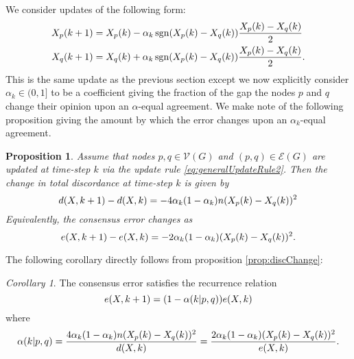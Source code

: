 \documentclass{article}
\newtheorem{proposition}{Proposition}
\theoremstyle{remark}
\newtheorem{corollary}{Corollary}
\DeclareMathOperator{\sgn}{sgn}
\begin{document}
We consider updates of the following form:
\begin{equation}{\label{eq:generalUpdateRule2}}
\begin{aligned}
        X_p(k+1) &= X_p(k) - \alpha_k\sgn(X_p(k)-X_q(k))\frac{X_p(k)-X_q(k)}{2}\\
        X_q(k+1) &= X_q(k) + \alpha_k\sgn(X_p(k)-X_q(k))\frac{X_p(k)-X_q(k)}{2}.
\end{aligned}
\end{equation}
This is the same update as the previous section except we now explicitly consider $\alpha_k\in(0,1]$ to be a coefficient giving the fraction of the gap the nodes $p$ and $q$ change their opinion upon an $\alpha$-equal agreement. We make note of the following proposition giving the amount by which the error changes upon an $\alpha_k$-equal agreement.
\begin{proposition}{\label{prop:discChange}}
        Assume that nodes $p,q\in\mathcal{V}(G)$ and $(p,q)\in\mathcal{E}(G)$ are updated at time-step $k$ via the update rule \eqref{eq:generalUpdateRule2}. Then the change in total discordance at time-step $k$ is given by
\begin{equation}{\label{prop:eq:discIncrement}}
        d(X,k+1)-d(X,k) = -4\alpha_k(1-\alpha_k)n(X_p(k)-X_q(k))^2
\end{equation}
Equivalently, the consensus error changes as
\begin{equation}{\label{prop:eq:errorIncrement}}
        e(X,k+1) - e(X,k) = -2\alpha_k(1-\alpha_k)(X_p(k)-X_q(k))^2.
\end{equation}
\end{proposition}
The following corollary directly follows from proposition \ref{prop:discChange}:
\begin{corollary}{\label{cor:recurrenceRelation}}
The consensus error satisfies the recurrence relation
\begin{equation}{\label{eq:discordanceRecurrence}}
e(X,k+1)=(1-\alpha(k|p,q))e(X,k)
\end{equation}
where
\begin{equation}{\label{eq:alphaDefn}}
	\alpha(k|p,q) = \frac{4\alpha_k(1-\alpha_k)n(X_p(k)-X_q(k))^2}{d(X,k)} = \frac{2\alpha_k(1-\alpha_k)(X_p(k)-X_q(k))^2}{e(X,k)}.
\end{equation}
\end{corollary}
\end{document}
